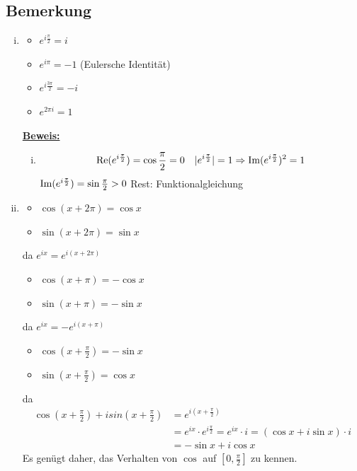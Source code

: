 \subsection{Bemerkung} %
\label{sub:bemerkung}
\begin{enumerate}[(i)]
	\item \begin{itemize}
		\item $e^{i \frac{\pi}{2} } = i$
		\item $e^{i \pi} = -1$ \quad (Eulersche Identität)
		\item $e^{i \frac{3 \pi}{2}}= -i$
		\item $e^{2 \pi i} = 1$
	\end{itemize}
	\underline{\textbf{Beweis:}} \\
	\begin{enumerate}[(i)]
		\item 
		\[
			\operatorname{Re} ( e^{i \frac{\pi}{2} })  =\cos \frac{\pi}{2} = 0 \quad | e^{i \frac{\pi}{2} } | = 1
			\Rightarrow \operatorname{Im} ( e^{i \frac{\pi}{2} })^2 = 1 
		\]
		$\operatorname{Im} ( e^{i \frac{\pi}{2} }) = \sin \frac{\pi}{2} > 0 $ Rest: Funktionalgleichung
	\end{enumerate}
	\item 
	\begin{itemize}
		\item $\cos (x + 2 \pi) = \cos x $
		\item $\sin ( x + 2 \pi) = \sin x$
	\end{itemize} da $e^{ix} = e^{i(x+2\pi)}$
	\begin{itemize}
		\item $\cos (x + \pi) = - \cos x$
		\item $\sin (x + \pi) = - \sin x$
	\end{itemize}
	da $e^{ix}= - e^{i (x+\pi)}$
	\begin{itemize}
		\item $\cos (x +\frac{\pi}{2} ) = - \sin x$
		\item $\sin ( x + \frac{\pi}{2} ) = \cos x$
	\end{itemize}
	da
	\begin{align*}
		\cos \left( x+ \frac{\pi}{2}  \right) + i sin \left( x + \frac{\pi}{2} \right) &= e^{i(x+\frac{\pi}{2} )} \\
		&= e^{ix} \cdot e^{i \frac{\pi}{2} } = e^{ix} \cdot i = (\cos x + i \sin x) \cdot  i \\
		&= - \sin x + i \cos x
	\end{align*}
	Es genügt daher, das Verhalten von $\cos$ auf $[0, \frac{\pi}{2} ]$ zu kennen.

\end{enumerate}
